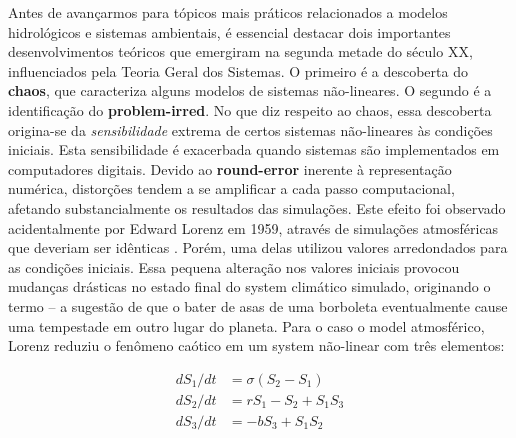 \documentclass[./main.tex]{subfiles}
\begin{document}
\par Antes de avançarmos para tópicos mais práticos relacionados a modelos hidrológicos e sistemas ambientais, é essencial destacar dois importantes desenvolvimentos teóricos que emergiram na segunda metade do século XX, influenciados pela Teoria Geral dos Sistemas. O primeiro é a descoberta do \textbf{\gls{chaos}}, que caracteriza alguns modelos de sistemas não-lineares. O segundo é a identificação do \textbf{\gls{problem-irred}}. No que diz respeito ao \gls{chaos}, essa descoberta origina-se da \textit{sensibilidade} extrema de certos sistemas não-lineares às condições iniciais. Esta sensibilidade é exacerbada quando sistemas são implementados em computadores digitais. Devido ao \textbf{\gls{round-error}} inerente à representação numérica, distorções tendem a se amplificar a cada passo computacional, afetando substancialmente os resultados das simulações. Este efeito foi observado acidentalmente por Edward Lorenz em 1959, através de simulações atmosféricas que deveriam ser idênticas \cite{lorenz1995}. Porém, uma delas utilizou valores arredondados para as condições iniciais. Essa pequena alteração nos valores iniciais provocou mudanças drásticas no estado final do \gls{system} climático simulado, originando o termo  – a sugestão de que o bater de asas de uma borboleta eventualmente cause uma tempestade em outro lugar do planeta. Para o caso o \gls{model} atmosférico, Lorenz reduziu o fenômeno caótico em um \gls{system} não-linear com três elementos:
\begin{linenomath*}
\[
\begin{split}
    dS_1/dt &= \sigma (S_2 - S_1)\\
    dS_2/dt &= rS_1 - S_2 + S_1S_3\\
    dS_3/dt &= -bS_3 + S_1S_2\\
\end{split}
\]
\end{linenomath*}
\end{document}
